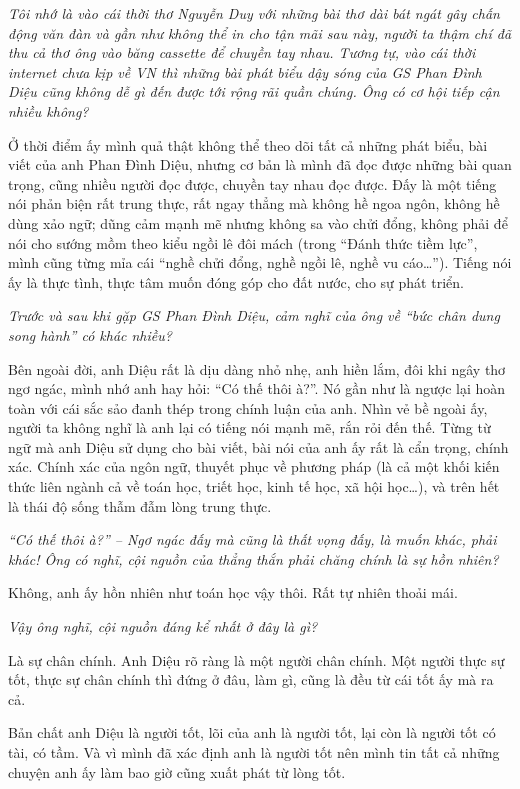 \emph{Tôi nhớ là vào cái thời thơ Nguyễn Duy với những bài thơ dài bát ngát gây chấn động văn đàn và gần như không thể in cho tận mãi sau này, người ta thậm chí đã thu cả thơ ông vào băng cassette để chuyền tay nhau. Tương tự, vào cái thời internet chưa kịp về VN thì những bài phát biểu dậy sóng của GS Phan Đình Diệu cũng không dễ gì đến được tới rộng rãi quần chúng. Ông có cơ hội tiếp cận nhiều không?}

Ở thời điểm ấy mình quả thật không thể theo dõi tất cả những phát biểu, bài viết của anh Phan Đình Diệu, nhưng cơ bản là mình đã đọc được những bài quan trọng, cũng nhiều người đọc được, chuyền tay nhau đọc được. Đấy là một tiếng nói phản biện rất trung thực, rất ngay thẳng mà không hề ngoa ngôn, không hề dùng xảo ngữ; dũng cảm mạnh mẽ nhưng không sa vào chửi đổng, không phải để nói cho sướng mồm theo kiểu ngồi lê đôi mách (trong “Đánh thức tiềm lực”, mình cũng từng mỉa cái “nghề chửi đổng, nghề ngồi lê, nghề vu cáo…”). Tiếng nói ấy là thực tình, thực tâm muốn đóng góp cho đất nước, cho sự phát triển.

\emph{Trước và sau khi gặp GS Phan Đình Diệu, cảm nghĩ của ông về “bức chân dung song hành” có khác nhiều?}

Bên ngoài đời, anh Diệu rất là dịu dàng nhỏ nhẹ, anh hiền lắm, đôi khi ngây thơ ngơ ngác, mình nhớ anh hay hỏi: “Có thế thôi à?”. Nó gần như là ngược lại hoàn toàn với cái sắc sảo đanh thép trong chính luận của anh. Nhìn vẻ bề ngoài ấy, người ta không nghĩ là anh lại có tiếng nói mạnh mẽ, rắn rỏi đến thế. Từng từ ngữ mà anh Diệu sử dụng cho bài viết, bài nói của anh ấy rất là cẩn trọng, chính xác. Chính xác của ngôn ngữ, thuyết phục về phương pháp (là cả một khối kiến thức liên ngành cả về toán học, triết học, kinh tế học, xã hội học…), và trên hết là thái độ sống thẫm đẫm lòng trung thực.

\emph{“Có thế thôi à?” – Ngơ ngác đấy mà cũng là thất vọng đấy, là muốn khác, phải khác! Ông có nghĩ, cội nguồn của thẳng thắn phải chăng chính là sự hồn nhiên?}

Không, anh ấy hồn nhiên như toán học vậy thôi. Rất tự nhiên thoải mái.

\emph{Vậy ông nghĩ, cội nguồn đáng kể nhất ở đây là gì?}


Là sự chân chính. Anh Diệu rõ ràng là một người chân chính. Một người thực sự tốt, thực sự chân chính thì đứng ở đâu, làm gì, cũng là đều từ cái tốt ấy mà ra cả.

Bản chất anh Diệu là người tốt, lõi của anh là người tốt, lại còn là người tốt có tài, có tầm. Và vì mình đã xác định anh là người tốt nên mình tin tất cả những chuyện anh ấy làm bao giờ cũng xuất phát từ lòng tốt.

